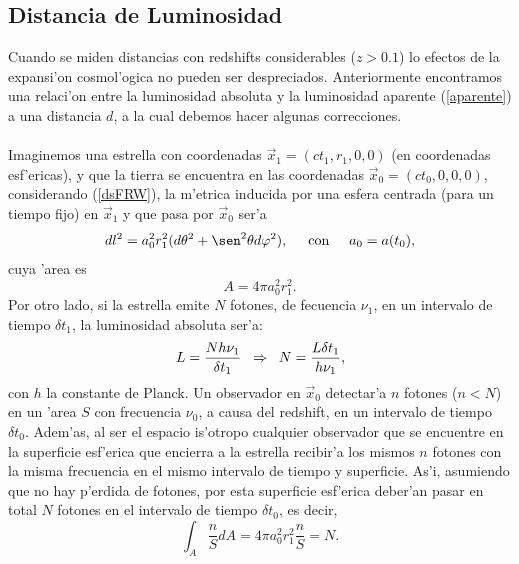 \subsection{Distancia de Luminosidad}
Cuando se miden distancias con redshifts considerables ($z>0.1$) lo efectos de la expansi'on cosmol'ogica no pueden ser 
despreciados. Anteriormente encontramos una relaci'on entre la luminosidad absoluta y la luminosidad aparente (\ref{aparente})
a una distancia $d$, a la cual debemos hacer algunas correcciones.\\ \\
Imaginemos una estrella con coordenadas $\vec{x}_{1}=(ct_{1},r_{1},0,0)$ (en coordenadas esf'ericas), y que la tierra
se encuentra en las coordenadas $\vec{x}_{0}=(ct_{0},0,0,0)$, considerando (\ref{dsFRW}), la m'etrica inducida por una esfera centrada
(para un tiempo fijo) en $\vec{x}_{1}$ y que pasa por $\vec{x}_{0}$ ser'a 
\begin{equation}
 dl^2=a_{0}^2 r_{1}^2(d\theta^2  +\sen^2\theta d\varphi^2),\hspace{0.5cm} \mbox{con} \hspace{0.5cm}  a_{0}= a(t_{0}),
\end{equation}
cuya 'area es
\begin{equation}
A=4\pi a_{0}^2 r_{1}^2 . 
\end{equation}
Por otro lado, si la estrella emite $N$ fotones, de fecuencia $\nu_{1}$, en un intervalo de tiempo $\delta t_{1}$, la 
luminosidad absoluta ser'a:
\begin{equation} 
L=\frac{N h\nu_{1}}{\delta t_{1}}  \hspace{0.2cm} \Rightarrow \hspace{0.2cm} N=\frac{L\delta t_{1}}{h\nu_{1}},\label{Ltotal}
\end{equation}
con $h$ la constante de Planck. Un observador en $\vec{x}_{0}$ detectar'a $n$ fotones ($n<N$) en un 'area $S$ con frecuencia $\nu_{0}$, a causa del redshift,
en un intervalo de tiempo $\delta t_{0}$. Adem'as, al ser el espacio is'otropo cualquier observador que se encuentre en la superficie
esf'erica que encierra a la estrella recibir'a los mismos $n$ fotones con la misma frecuencia en el mismo intervalo de tiempo y superficie. As'i,
asumiendo que no hay p'erdida de fotones, por esta superficie esf'erica deber'an pasar en total $N$ fotones en el intervalo
de tiempo $\delta t_{0}$, es decir,
\begin{equation}
\int_{A}\frac{n}{S}dA=4\pi a_{0}^2 r_{1}^2 \frac{n}{S}= N.
\end{equation}
